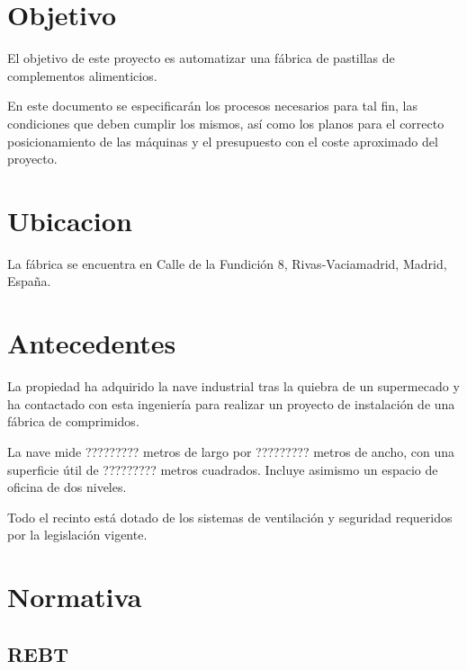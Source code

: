 \section{Objetivo}
El objetivo de este proyecto es automatizar una fábrica de pastillas de complementos alimenticios.

En este documento se especificarán los procesos necesarios para tal fin, las condiciones que deben cumplir los mismos, así como los planos para el correcto posicionamiento de las máquinas y el presupuesto con el coste aproximado del proyecto. 
 
\section{Ubicacion}

La fábrica se encuentra en Calle de la Fundición 8, Rivas-Vaciamadrid, Madrid, España.

\section{Antecedentes}
La propiedad ha adquirido la nave industrial tras la quiebra de un supermecado y ha contactado con esta ingeniería para realizar un proyecto de instalación de una fábrica de comprimidos. 

La nave mide ????????? metros de largo por ????????? metros de ancho, con una superficie útil de ????????? metros cuadrados.  
Incluye asimismo un espacio de oficina de dos niveles.  

Todo el recinto está dotado de los sistemas de ventilación y seguridad requeridos por la legislación vigente.

\section{Normativa}

\subsection{REBT}

